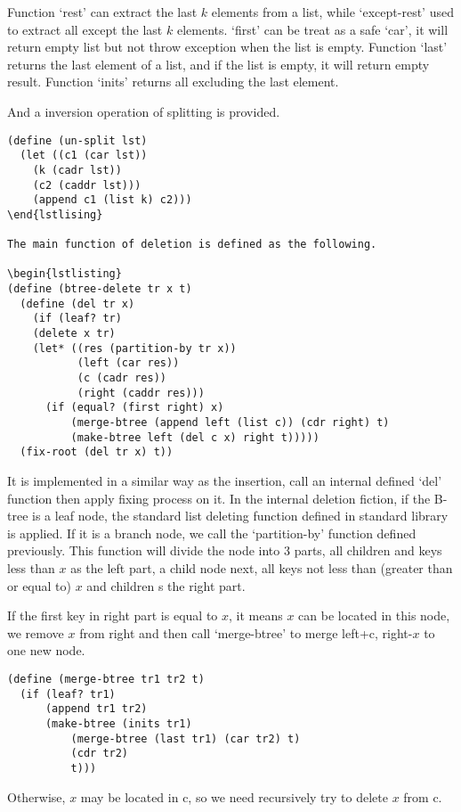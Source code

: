 \documentclass{article}
\begin{document}
Function `rest' can extract the last $k$ elements from a list, while
`except-rest' used to extract all except the last $k$ elements.
`first' can be treat as a safe `car', it will return empty list but not
throw exception when the list is empty. Function `last' returns the
last element of a list, and if the list is empty, it will return 
empty result. Function `inits' returns all excluding the last element.

And a inversion operation of splitting is provided.

\begin{lstlisting}
(define (un-split lst)
  (let ((c1 (car lst))
	(k (cadr lst))
	(c2 (caddr lst)))
    (append c1 (list k) c2)))
\end{lstlising}

The main function of deletion is defined as the following.

\begin{lstlisting}
(define (btree-delete tr x t)
  (define (del tr x)
    (if (leaf? tr)
	(delete x tr)
	(let* ((res (partition-by tr x))
	       (left (car res))
	       (c (cadr res))
	       (right (caddr res)))
	  (if (equal? (first right) x)
	      (merge-btree (append left (list c)) (cdr right) t)
	      (make-btree left (del c x) right t)))))
  (fix-root (del tr x) t))
\end{lstlisting}

It is implemented in a similar way as the insertion, call an internal
defined `del' function then apply fixing process on it. In the internal
deletion fiction, if the B-tree is a leaf node, the standard list
deleting function defined in standard library is applied. If it is
a branch node, we call the `partition-by' function defined previously.
This function will divide the node into 3 parts, all children and
keys less than $x$ as the left part, a child node next, all keys not less
than (greater than or equal to) $x$ and children s the right part.

If the first key in right part is equal to $x$, it means $x$ can
be located in this node, we remove $x$ from right and then
call `merge-btree' to merge left+c, right-$x$ to one new node.

\begin{lstlisting}
(define (merge-btree tr1 tr2 t)
  (if (leaf? tr1)
      (append tr1 tr2)
      (make-btree (inits tr1)
		  (merge-btree (last tr1) (car tr2) t)
		  (cdr tr2)
		  t)))
\end{lstlisting}

Otherwise, $x$ may be located in c, so we need recursively try
to delete $x$ from c.
\end{document}
